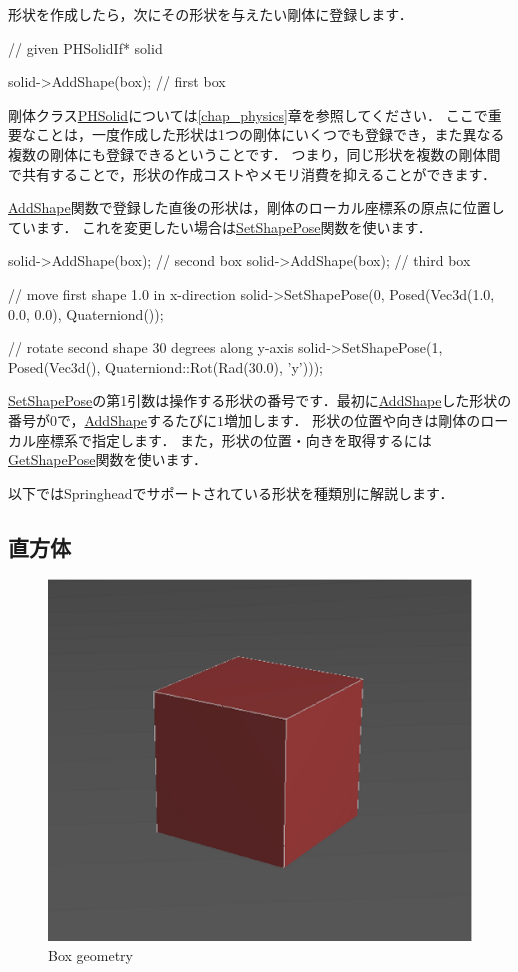 \KLUDGE 形状を作成したら，次にその形状を与えたい剛体に登録します．
\begin{sourcecode}
// given PHSolidIf* solid

solid->AddShape(box);         // first box
\end{sourcecode}
\KLUDGE 剛体クラス\url{PHSolid}については\ref{chap_physics}章を参照してください．
\KLUDGE ここで重要なことは，一度作成した形状は1つの剛体にいくつでも登録でき，また異なる複数の剛体にも登録できるということです．
\KLUDGE つまり，同じ形状を複数の剛体間で共有することで，形状の作成コストやメモリ消費を抑えることができます．

\url{AddShape}関数で登録した直後の形状は，剛体のローカル座標系の原点に位置しています．
\KLUDGE これを変更したい場合は\url{SetShapePose}関数を使います．
\begin{sourcecode}
solid->AddShape(box);         // second box
solid->AddShape(box);         // third box 

// move first shape 1.0 in x-direction
solid->SetShapePose(0, Posed(Vec3d(1.0, 0.0, 0.0), Quaterniond());

// rotate second shape 30 degrees along y-axis
solid->SetShapePose(1, Posed(Vec3d(),
                    Quaterniond::Rot(Rad(30.0), 'y')));
\end{sourcecode}
\url{SetShapePose}の第1引数は操作する形状の番号です．最初に\url{AddShape}した形状の番号が$0$で，\url{AddShape}するたびに$1$増加します．
\KLUDGE 形状の位置や向きは剛体のローカル座標系で指定します．
\KLUDGE また，形状の位置・向きを取得するには\url{GetShapePose}関数を使います．

\KLUDGE 以下ではSpringheadでサポートされている形状を種類別に解説します．

\subsection*{直方体}

\begin{figure}[t]
\begin{center}
\includegraphics[width=.4\hsize]{fig/cdbox.eps}
\end{center}
\caption{Box geometry}
\label{fig_cdbox}
\end{figure}

